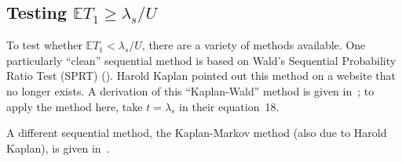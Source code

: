 \subsection{Testing $\mathbb{E} T_1 \ge \lambda_s/U$}

To test whether $\mathbb{E} T_1 < \lambda_s/U$, there are a variety of methods available.
One particularly ``clean'' sequential method is based on Wald's Sequential Probability
Ratio Test (SPRT) (\cite{wald45}).
Harold Kaplan pointed out this method on a website that no longer exists.
A derivation of this ``Kaplan-Wald'' method is given in~\citet[Appendix A]{starkTeague14};
to apply the method here, take $t = \lambda_s$ in their equation~18.

A different sequential method, the Kaplan-Markov method (also due to Harold Kaplan), 
is given in~\citet{stark09b}.
